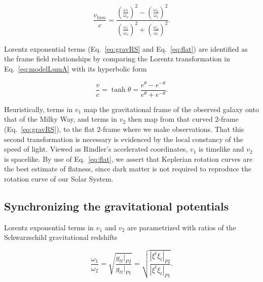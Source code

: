 \documentclass[reprint,%
 amsmath,amssymb,
 aps,
]{revtex4-1}
\begin{document}
 \begin{equation}
 \frac{v_{lum} }{c}=
\frac{  \left( \frac{\omega_{l}}{\omega_o}\right)^2 -  \left( \frac{\omega_o}{\omega_{l}} \right)^2 }{  \left( \frac{\omega_{l}}{\omega_o}\right)^2  +  \left( \frac{\omega_o}{\omega_{l}}\right)^2 }. 
\label{eq:lumlorentz}
\end{equation} 
 
 
  Lorentz exponential terms (Eq.~\ref{eq:gravRS} and Eq.~\ref{eq:flat})
  are    identified  as the  frame field relationships   by  comparing 
     the  Lorentz transformation in  Eq.~\ref{eq:modelLumA} with 
 its   hyperbolic form \cite{rindler2013essential} 


     \begin{equation}
         \frac{v}{c} = \tanh \theta = \frac{e^\theta - e^{-\theta}}{e^\theta + e^{-\theta}} .   
         \label{boost}
     \end{equation} 

 
 
Heuristically, terms in  $v_1$ map the gravitational frame of the observed galaxy onto that of the Milky Way, and  terms in $v_2$  then  map from  that   curved 2-frame  (Eq.~\ref{eq:gravRS}),  to  the flat 2-frame where we make observations. 
  That this second transformation  is necessary is evidenced by the local constancy of the speed of light. Viewed as    Rindler's accelerated coordinates\cite{MTW,Wald, rindler2013essential}, 
     $v_1$   is  timelike   and $v_2$ is spacelike.
By use of Eq.~\ref{eq:flat}, we    assert  that Keplerian rotation curves are     the best estimate of flatness, since dark matter is not required to  reproduce the rotation curve of our Solar System.
 
    
  
 
  
 
 
\subsection{Synchronizing the gravitational potentials \label{sec:gravDets}}

  
    
    

 
Lorentz exponential terms in  $v_1$ and $v_2$ are parametrized with ratios of  the    Schwarzschild gravitational redshifts

\begin{equation}
       \frac{\omega_1}{\omega_2}  =\sqrt{\frac{g_{tt}|_{P2}}{g_{tt}|_{P1}}} =\sqrt{\frac{|\xi^t\xi_{t}|_{P2}}{|\xi^t\xi_{t}|_{P1}}}.
      \label{eq:grav}
    \end{equation} 
    
\end{document}
